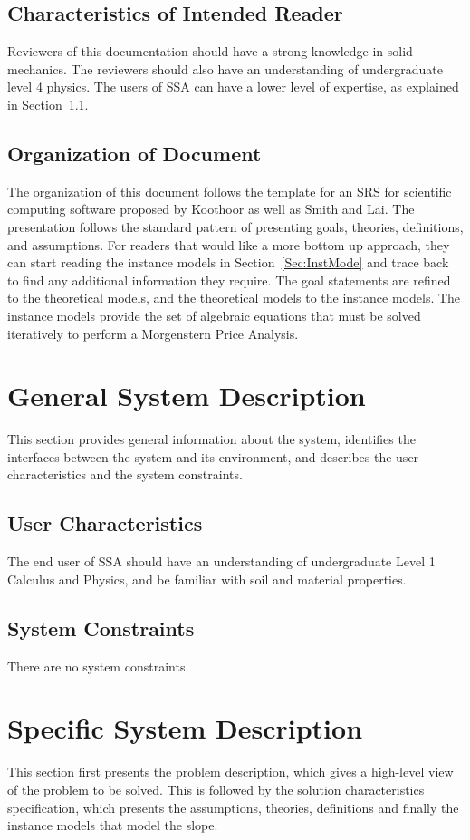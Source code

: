 \documentclass[12pt]{article}
\begin{document}
\subsection{Characteristics of Intended Reader}
\label{Sec:CharofInteRead}
Reviewers of this documentation should have a strong knowledge in solid mechanics. The reviewers should also have an understanding of undergraduate level 4 physics. The users of SSA can have a lower level of expertise, as explained in Section~\ref{Sec:UserChar}.
\subsection{Organization of Document}
\label{Sec:OrgaofDocu}
The organization of this document follows the template for an SRS for scientific computing software proposed by Koothoor as well as Smith and Lai. The presentation follows the standard pattern of presenting goals, theories, definitions, and assumptions. For readers that would like a more bottom up approach, they can start reading the instance models in Section~\ref{Sec:InstMode} and trace back to find any additional information they require.
The goal statements are refined to the theoretical models, and the theoretical models to the instance models. The instance models provide the set of algebraic equations that must be solved iteratively to perform a Morgenstern Price Analysis.
\section{General System Description}
\label{Sec:GeneSystDesc}
This section provides general information about the system, identifies the interfaces between the system and its environment, and describes the user characteristics and the system constraints.
\subsection{User Characteristics}
\label{Sec:UserChar}
The end user of SSA should have an understanding of undergraduate Level 1 Calculus and Physics, and be familiar with soil and material properties.
\subsection{System Constraints}
\label{Sec:SystCons}
There are no system constraints.
\section{Specific System Description}
\label{Sec:SpecSystDesc}
This section first presents the problem description, which gives a high-level view of the problem to be solved. This is followed by the solution characteristics specification, which presents the assumptions, theories, definitions and finally the instance models that model the slope.
\end{document}
